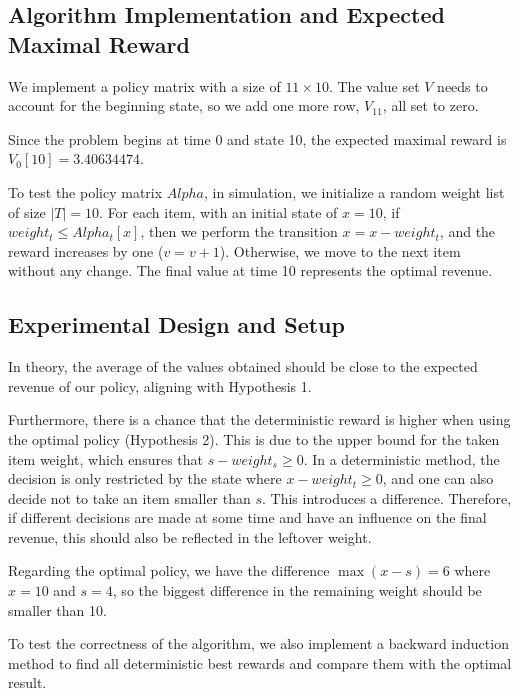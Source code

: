 \subsection{Algorithm Implementation and Expected Maximal Reward}
\label{sec:alg}

We implement a policy matrix with a size of $11 \times 10$. The value set $V$ needs to account for the beginning state, so we add one more row, $V_{11}$, all set to zero.

Since the problem begins at time 0 and state 10, the expected maximal reward is $V_0[10] = 3.40634474$.

To test the policy matrix $Alpha$, in simulation, we initialize a random weight list of size $|T| = 10$. For each item, with an initial state of $x=10$, if $weight_t \leq Alpha_t[x]$, then we perform the transition $x=x-weight_t$, and the reward increases by one ($v=v+1$). Otherwise, we move to the next item without any change. The final value at time 10 represents the optimal revenue.

\subsection{Experimental Design and Setup}

In theory, the average of the values obtained should be close to the expected revenue of our policy, aligning with Hypothesis 1.

Furthermore, there is a chance that the deterministic reward is higher when using the optimal policy (Hypothesis 2). This is due to the upper bound for the taken item weight, which ensures that $s - weight_s \geq 0$. In a deterministic method, the decision is only restricted by the state where $x - weight_t \geq 0$, and one can also decide not to take an item smaller than $s$. This introduces a difference. Therefore, if different decisions are made at some time and have an influence on the final revenue, this should also be reflected in the leftover weight.

Regarding the optimal policy, we have the difference $\max(x-s) = 6$ where $x = 10$ and $s = 4$, so the biggest difference in the remaining weight should be smaller than 10.

To test the correctness of the algorithm, we also implement a backward induction method to find all deterministic best rewards and compare them with the optimal result.

